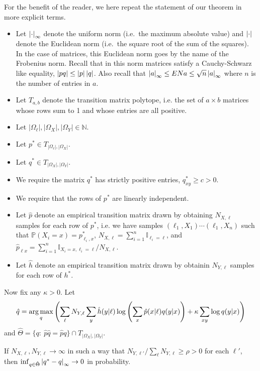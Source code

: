 \label{sec:proof}

For the benefit of the reader, we here repeat the statement of our theorem in more explicit terms.  

\begin{itemize}
\item Let $\left|\cdot\right|_\infty$ denote the uniform norm (i.e.\ the maximum absolute value) and $\left|\cdot\right|$ denote the Euclidean norm (i.e.\ the square root of the sum of the squares).  In the case of matrices, this Euclidean norm goes by the name of the Frobenius norm.  Recall that in this norm matrices satisfy a Cauchy-Schwarz like equality, $\left|pq\right|\leq\left|p\right|\left|q\right|$.  Also recall that $\left|a\right|_\infty \leq EN{a} \leq \sqrt{n}\left|a\right|_\infty$ where $n$ is the number of entries in $a$.
\item Let $T_{a,b}$ denote the transition matrix polytope, i.e. the set of $a\times b$ matrices whose rows sum to 1 and whose entries are all positive.
\item Let $|\Omega_\ell|,|\Omega_X|,|\Omega_Y| \in \mathbb{N}$.
\item Let $p^*\in T_{|\Omega_\ell|,|\Omega_X|}$.
\item Let $q^*\in T_{|\Omega_X|,|\Omega_Y|}$.
\item We require the matrix $q^*$ has strictly positive entries, $q^*_{xy}\geq c>0$.
\item We require that the rows of $p^*$ are linearly independent.
\item Let $\hat p$ denote an empirical transition matrix drawn by obtaining $N_{X,\ell}$ samples for each row of $p^*$, i.e. we have samples $(\ell_1,X_1) \cdots (\ell_1,X_n)$ such that $\mathbb{P}(X_i=x) = p^*_{\ell_i,x}$, $N_{X,\ell}=\sum_{i=1}^n \mathbb{I}_{\ell_i=\ell}$, and $\hat p_{\ell x} = \sum_{i=1}^n \mathbb{I}_{X_i=x,\ell_i=\ell} / N_{X,\ell}$. 
\item Let $\hat h$ denote an empirical transition matrix drawn by obtainin $N_{Y,\ell}$ samples for each row of $h^*$.  
\end{itemize}

Now fix any $\kappa>0$.  Let
\begin{align}
\hat q = \operatorname*{arg\,max}_q \left(\sum_\ell N_{Y,\ell}\sum_{y}\hat h(y|\ell)\log\left(\sum_{x}\hat p(x|\ell)q(y|x)\right) + \kappa \sum_{xy} \log q(y|x)\right)\label{eq:mindef}
\end{align}
and $\hat \Theta=\{q:\ \hat p\hat q=\hat pq\} \cap T_{|\Omega_X|,|\Omega_Y|}$.  
\vspace{.1in}
\begin{thm}
If $N_{X,\ell},N_{Y,\ell}\rightarrow \infty$ in such a way that $N_{Y,\ell'}/\sum_{\ell}N_{Y,\ell} \geq \rho>0$ for each $\ell'$, then $\inf_{q\in \hat\Theta} \left|q^*-q\right|_\infty\rightarrow 0$ in probability.
\end{thm}

